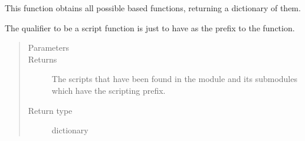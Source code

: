 \documentclass[letterpaper,10pt,english]{sphinxmanual}
\begin{document}

\begin{fulllineitems}
\label{\detokenize{docstrings/ifa_smeargle.runtime:ifa_smeargle.runtime.get_script_functions}}
This function obtains all possible  based
functions, returning a dictionary of them.

The qualifier to be a script function is just to have 
as the prefix to the function.
\begin{quote}\begin{description}
\item[{Parameters}] \leavevmode
{} \textendash{} 

\item[{Returns}] \leavevmode
{} \textendash{} The scripts that have been found in the module and its
sub\sphinxhyphen{}modules which have the scripting prefix.

\item[{Return type}] \leavevmode
dictionary

\end{description}\end{quote}

\end{fulllineitems}

\end{document}
